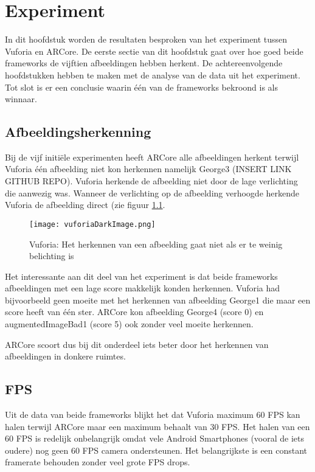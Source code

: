 \chapter{Experiment}
\label{ch:experiment}

In dit hoofdstuk worden de resultaten besproken van het experiment tussen Vuforia en ARCore. De eerste sectie van dit hoofdstuk gaat over hoe goed beide frameworks de vijftien afbeeldingen hebben herkent. De achtereenvolgende hoofdstukken hebben te maken met de analyse van de data uit het experiment. Tot slot is er een conclusie waarin één van de frameworks bekroond is als winnaar.

\section{Afbeeldingsherkenning}
Bij de vijf initiële experimenten heeft ARCore alle afbeeldingen herkent terwijl Vuforia één afbeelding niet kon herkennen namelijk George3 (INSERT LINK GITHUB REPO). Vuforia herkende de afbeelding niet door de lage verlichting die aanwezig was. Wanneer de verlichting op de afbeelding verhoogde herkende Vuforia de afbeelding direct (zie figuur \ref{fig:vuforiaDarkImage}.

\begin{figure}
    \texttt{[image: vuforiaDarkImage.png]}
    \caption{Vuforia: Het herkennen van een afbeelding gaat niet als er te weinig belichting is}
    \label{fig:vuforiaDarkImage}
\end{figure}


Het interessante aan dit deel van het experiment is dat beide frameworks afbeeldingen met een lage score makkelijk konden herkennen. Vuforia had bijvoorbeeld geen moeite met het herkennen van afbeelding George1 die maar een score heeft van één ster. ARCore kon afbeelding George4 (score 0) en augmentedImageBad1 (score 5) ook zonder veel moeite herkennen.

ARCore scoort dus bij dit onderdeel iets beter door het herkennen van afbeeldingen in donkere ruimtes.

\section{FPS}\label{sec:fps}

Uit de data van beide frameworks blijkt het dat Vuforia maximum 60 FPS kan halen terwijl ARCore maar een maximum behaalt van 30 FPS. Het halen van een 60 FPS is redelijk onbelangrijk omdat vele Android Smartphones (vooral de iets oudere) nog geen 60 FPS camera ondersteunen. Het belangrijkste is een constant framerate behouden zonder veel grote FPS drops.


